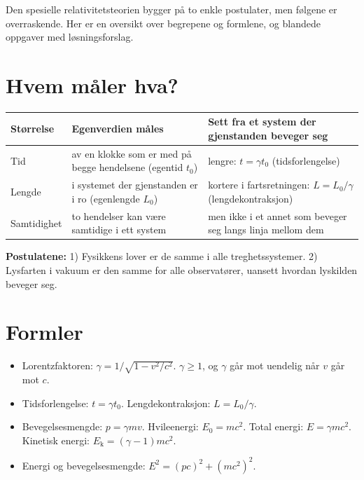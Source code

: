 \documentclass[11pt]{article}
\begin{document}

Den spesielle relativitetsteorien bygger på to enkle postulater, men følgene er overraskende. Her er en oversikt over begrepene og formlene, og blandede oppgaver med løsningsforslag.

\section*{Hvem måler hva?}

\begin{center}\small
\begin{tabularx}{\linewidth}{YYY}
\toprule
\textbf{Størrelse} & \textbf{Egenverdien måles} & \textbf{Sett fra et system der gjenstanden beveger seg} \\
\midrule
Tid & av en klokke som er med på begge hendelsene (egentid $t_{0}$) & lengre: $t = γt_{0}$ (tidsforlengelse) \\
Lengde & i systemet der gjenstanden er i ro (egenlengde $L_{0}$) & kortere i fartsretningen: $L = L_{0}/γ$ (lengdekontraksjon) \\
Samtidighet & to hendelser kan være samtidige i ett system & men ikke i et annet som beveger seg langs linja mellom dem \\
\bottomrule
\end{tabularx}
\end{center}

\textbf{Postulatene:} 1) Fysikkens lover er de samme i alle treghetssystemer. 2) Lysfarten i vakuum er den samme for alle observatører, uansett hvordan lyskilden beveger seg.

\section*{Formler}

\begin{itemize}
\item Lorentzfaktoren: $γ = 1/\sqrt{1 - v^{2}/c^{2}}$. $γ \geq 1$, og $γ$ går mot uendelig når $v$ går mot $c$.
\item Tidsforlengelse: $t = γt_{0}$. Lengdekontraksjon: $L = L_{0}/γ$.
\item Bevegelsesmengde: $p = γmv$. Hvileenergi: $E_{0} = mc^{2}$. Total energi: $E = γmc^{2}$. Kinetisk energi: $E_{\mathrm{k}} = (γ - 1)mc^{2}$.
\item Energi og bevegelsesmengde: $E^{2} = (pc)^{2} + (mc^{2})^{2}$.
\end{itemize}
\end{document}
